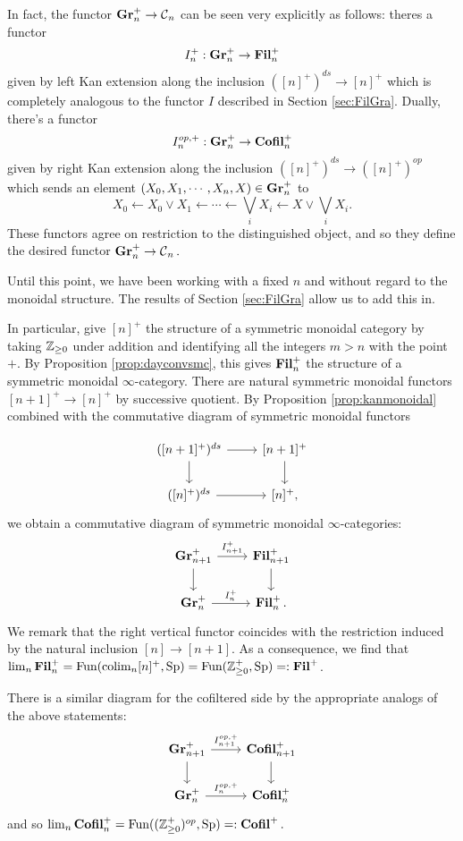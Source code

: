 In fact, the functor $\operatorname{\textbf{Gr}}_n^+ \to \operatorname{\mathcal{C}}_n$ can be seen very explicitly as follows: theres a functor $$I_n^+: \operatorname{\textbf{Gr}}_n^+ \to \operatorname{\textbf{Fil}}_n^+$$ given by left Kan extension along the inclusion $([n]^+)^{ds} \to [n]^+$ which is completely analogous to the functor $I$ described in Section \ref{sec:FilGra}.  Dually, there's a functor $$I_n^{op,+}:\operatorname{\textbf{Gr}}_n^+ \to \operatorname{\textbf{Cofil}}_n^+$$ given by right Kan extension along the inclusion $([n]^+)^{ds} \to ([n]^+)^{op}$ which sends an element $(X_0, X_1, \cdots, X_n, X)\in \operatorname{\textbf{Gr}}_n^+$ to $$X_0 \longleftarrow X_0\vee X_1 \longleftarrow \cdots \longleftarrow \bigvee_i X_i \longleftarrow X \vee \bigvee_i X_i.$$  These functors agree on restriction to the distinguished object, and so they define the desired functor $\operatorname{\textbf{Gr}}_n^+ \to \operatorname{\mathcal{C}}_n.$  



Until this point, we have been working with a fixed $n$ and without regard to the monoidal structure.  The results of Section \ref{sec:FilGra} allow us to add this in.  

In particular, give $[n]^+$ the structure of a symmetric monoidal category by taking $\operatorname{\mathbb{Z}}_{\geq 0}$ under addition and identifying all the integers $m >n$ with the point $+$.  By Proposition \ref{prop:dayconvsmc}, this gives $\operatorname{\textbf{Fil}}_n^+$ the structure of a symmetric monoidal $\infty$-category.  There are natural symmetric monoidal functors $[n+1]^+ \to [n]^+$ by successive quotient.  By Proposition \ref{prop:kanmonoidal} combined with the commutative diagram of symmetric monoidal functors

$$
\begin{tikzcd}
(\lbrack n+1\rbrack^+)^{ds} \arrow[r] \arrow[d] & \lbrack n+1\rbrack^+ \arrow[d]\\
(\lbrack n\rbrack^+)^{ds} \arrow[r] & \lbrack n\rbrack^+ ,
\end{tikzcd}
$$
we obtain a commutative diagram of symmetric monoidal $\infty$-categories:
$$
\begin{tikzcd}
\Gr_{n+1}^+ \arrow[r,"I_{n+1}^+"] \arrow[d] & \Fil_{n+1}^+ \arrow[d]\\
\Gr_n^+  \arrow[r,"I_n^+"] & \Fil_n^+ .
\end{tikzcd}
$$
We remark that the right vertical functor coincides with the restriction induced by the natural inclusion $[n] \to [n+1]$.  As a consequence, we find that $\lim_n \operatorname{\textbf{Fil}}_n^+ = \operatorname{\text{Fun}}(\operatorname*{\text{colim}}_n [n]^+, \operatorname{\text{Sp}}) = \operatorname{\text{Fun}}(\operatorname{\mathbb{Z}}_{\geq 0}^+, \operatorname{\text{Sp}}) =: \operatorname{\textbf{Fil}}^+$.  

There is a similar diagram for the cofiltered side by the appropriate analogs of the above statements:
$$
\begin{tikzcd}
\Gr_{n+1}^+ \arrow[r,"I_{n+1}^{op,+}"] \arrow[d] & \Cofil_{n+1}^+ \arrow[d]\\
\Gr_n^+  \arrow[r,"I_n^{op,+}"] & \Cofil_n^+ 
\end{tikzcd}
$$
and so $\lim_n \operatorname{\textbf{Cofil}}_n^+ = \operatorname{\text{Fun}}((\operatorname{\mathbb{Z}}_{\geq 0}^{+})^{op}, \operatorname{\text{Sp}}) =: \operatorname{\textbf{Cofil}}^+.$  

